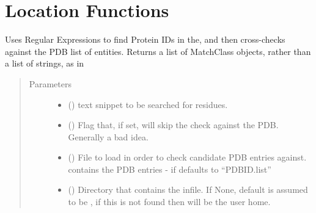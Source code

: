\documentclass[letterpaper,10pt,english]{sphinxmanual}
\begin{document}
\chapter{Location Functions}
\label{\detokenize{functions:location-functions}}

\begin{fulllineitems}
\label{\detokenize{functions:pyresid.locate_proteins}}
Uses Regular Expressions to find Protein IDs in the, and then cross-checks against the PDB list
of entities. Returns a list of MatchClass objects, rather than a list of strings, as in
\begin{quote}\begin{description}
\item[{Parameters}] \leavevmode\begin{itemize}
\item {} 
 () \textendash{} text snippet to be searched for residues.

\item {} 
 (\sphinxstyleliteralemphasis{\sphinxupquote{, }}\sphinxstyleliteralemphasis{\sphinxupquote{, }}) \textendash{} Flag that, if set, will skip the check against the PDB. Generally a bad idea.

\item {} 
 (\sphinxstyleliteralemphasis{\sphinxupquote{, }}\sphinxstyleliteralemphasis{\sphinxupquote{, }}) \textendash{} File to load in order to check candidate PDB entries against. contains the PDB entries -
if  defaults to “PDBID.list”

\item {} 
 (\sphinxstyleliteralemphasis{\sphinxupquote{, }}\sphinxstyleliteralemphasis{\sphinxupquote{, }}) \textendash{} Directory that contains the infile. If None, default is assumed to be , if this
is not found then will be the user home.


\end{itemize}
\end{description}
\end{quote}
\end{fulllineitems}
\end{document}
